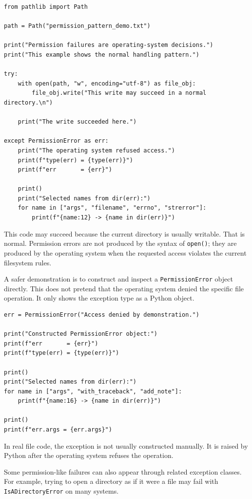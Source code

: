 \begin{verbatim}
from pathlib import Path

path = Path("permission_pattern_demo.txt")

print("Permission failures are operating-system decisions.")
print("This example shows the normal handling pattern.")

try:
    with open(path, "w", encoding="utf-8") as file_obj:
        file_obj.write("This write may succeed in a normal directory.\n")

    print("The write succeeded here.")

except PermissionError as err:
    print("The operating system refused access.")
    print(f"type(err) = {type(err)}")
    print(f"err       = {err}")

    print()
    print("Selected names from dir(err):")
    for name in ["args", "filename", "errno", "strerror"]:
        print(f"{name:12} -> {name in dir(err)}")
\end{verbatim}

This code may succeed because the current directory is usually writable. That is normal. Permission errors are not produced by the syntax of \texttt{open()}; they are produced by the operating system when the requested access violates the current filesystem rules.

A safer demonstration is to construct and inspect a \texttt{PermissionError} object directly. This does not pretend that the operating system denied the specific file operation. It only shows the exception type as a Python object.

\begin{verbatim}
err = PermissionError("Access denied by demonstration.")

print("Constructed PermissionError object:")
print(f"err       = {err}")
print(f"type(err) = {type(err)}")

print()
print("Selected names from dir(err):")
for name in ["args", "with_traceback", "add_note"]:
    print(f"{name:16} -> {name in dir(err)}")

print()
print(f"err.args = {err.args}")
\end{verbatim}

In real file code, the exception is not usually constructed manually. It is raised by Python after the operating system refuses the operation.

Some permission-like failures can also appear through related exception classes. For example, trying to open a directory as if it were a file may fail with \texttt{IsADirectoryError} on many systems.

